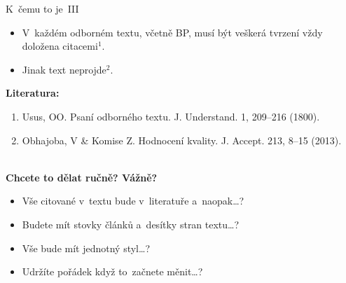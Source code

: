 \documentclass[compress, ucs, xelatex, 11pt, xcolor=svgnames, aspectratio=169,
	hyperref={
		bookmarks=true,
		unicode=true,
		colorlinks=true,
		pdftitle={Citacni software},
		plainpages=false,
		pdfauthor={Vojtech Zeisek},
		pdfsubject={Kratky uvod do citacniho software},
		pdfcreator={XeLaTeX},
		pdfkeywords={citace, reference, software, literatura},
		linkcolor=Crimson, %
		anchorcolor=Magenta, %
		citecolor=Magenta, %
		filecolor=Magenta, %
		menucolor=Magenta, %
		urlcolor=DarkTurquoise, %
		pdftex},
	url={hyphens, lowtilde} %
	]{beamer}
\begin{document}
\begin{frame}{K~čemu to je~III}
	\begin{itemize}
		\item V~každém odborném textu, včetně BP, musí být veškerá tvrzení vždy doložena citacemi$^{1}$.
		\item Jinak text neprojde$^{2}$.
	\end{itemize}
	\textbf{Literatura:}
	\begin{enumerate}
		\item Usus, OO. Psaní odborného textu. J. Understand. 1, 209--216 (1800).
		\item Obhajoba, V \& Komise Z. Hodnocení kvality. J. Accept. 213, 8--15 (2013).
	\end{enumerate}
	\hrulefill\\
	\textbf{Chcete to dělat ručně? Vážně?}
	\begin{itemize}
		\item Vše citované v~textu bude v~literatuře a~naopak\ldots?
		\item Budete mít stovky článků a~desítky stran textu\ldots?
		\item Vše bude mít jednotný styl\ldots?
		\item Udržíte pořádek když to~začnete měnit\ldots?
	\end{itemize}
\end{frame}
\end{document}
